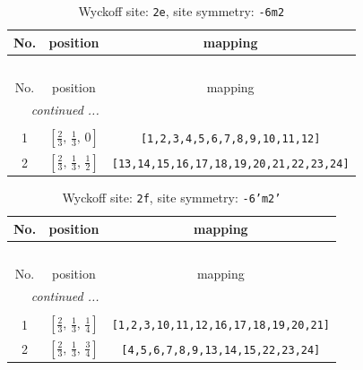 \documentclass[fleqn,8pt]{jsarticle}
\begin{document}
\begin{longtable}{ccc}
\caption{Wyckoff site: {\tt 2e}, site symmetry: {\tt -6m2}}
 \\
 \hline \hline
No. & position & mapping \\ \hline \endfirsthead

\multicolumn{2}{l}{\tablename\ \thetable{}} \\
 \hline \hline
No. & position & mapping \\ \hline \endhead

 \hline \hline
\multicolumn{2}{r}{\footnotesize\it continued ...} \\ \endfoot

 \hline \hline
\multicolumn{2}{r}{} \\ \endlastfoot

1 & $\left[ \frac{2}{3},\, \frac{1}{3},\, 0 \right]$ & {\tt [1,2,3,4,5,6,7,8,9,10,11,12]} \\ \hline
2 & $\left[ \frac{2}{3},\, \frac{1}{3},\, \frac{1}{2} \right]$ & {\tt [13,14,15,16,17,18,19,20,21,22,23,24]} \\
\end{longtable}
\renewcommand{\arraystretch}{1.2}
\begin{longtable}{ccc}
\caption{Wyckoff site: {\tt 2f}, site symmetry: {\tt -6'm2'}}
 \\
 \hline \hline
No. & position & mapping \\ \hline \endfirsthead

\multicolumn{2}{l}{\tablename\ \thetable{}} \\
 \hline \hline
No. & position & mapping \\ \hline \endhead

 \hline \hline
\multicolumn{2}{r}{\footnotesize\it continued ...} \\ \endfoot

 \hline \hline
\multicolumn{2}{r}{} \\ \endlastfoot

1 & $\left[ \frac{2}{3},\, \frac{1}{3},\, \frac{1}{4} \right]$ & {\tt [1,2,3,10,11,12,16,17,18,19,20,21]} \\ \hline
2 & $\left[ \frac{2}{3},\, \frac{1}{3},\, \frac{3}{4} \right]$ & {\tt [4,5,6,7,8,9,13,14,15,22,23,24]} \\
\end{longtable}
\renewcommand{\arraystretch}{1.2}
\end{document}

